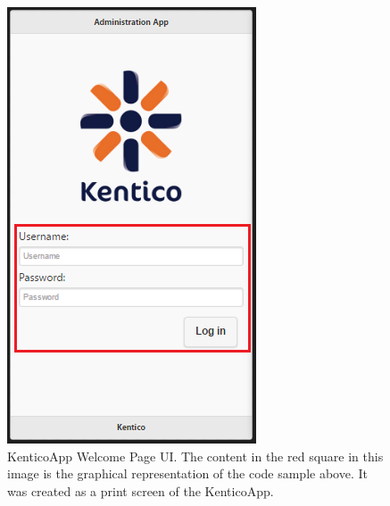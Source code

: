 \begin{figure}
  \includegraphics[width=\textwidth/2]{Images/WelcomePageIllistration.png}
  \caption{KenticoApp Welcome Page UI. The content in the red square in this image is the graphical representation of the code sample above. It was created as a print screen of the KenticoApp.}
  \label{WelcomePageIllistration}
\end{figure}
